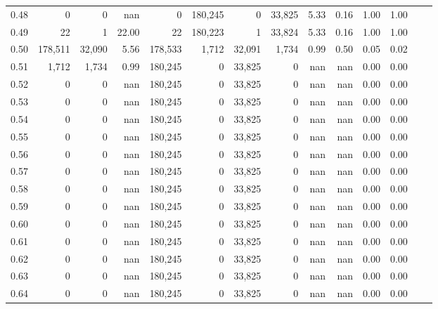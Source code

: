 \begin{tabular}{rrrrrrrrrrrrrr}
0.48 &        0 &       0 &     nan &        0 &  180,245 &       0 &  33,825 &  5.33 &  0.16 &  1.00 &      1.00 \\
0.49 &       22 &       1 &   22.00 &       22 &  180,223 &       1 &  33,824 &  5.33 &  0.16 &  1.00 &      1.00 \\
0.50 &  178,511 &  32,090 &    5.56 &  178,533 &    1,712 &  32,091 &   1,734 &  0.99 &  0.50 &  0.05 &      0.02 \\
0.51 &    1,712 &   1,734 &    0.99 &  180,245 &        0 &  33,825 &       0 &   nan &   nan &  0.00 &      0.00 \\
0.52 &        0 &       0 &     nan &  180,245 &        0 &  33,825 &       0 &   nan &   nan &  0.00 &      0.00 \\
0.53 &        0 &       0 &     nan &  180,245 &        0 &  33,825 &       0 &   nan &   nan &  0.00 &      0.00 \\
0.54 &        0 &       0 &     nan &  180,245 &        0 &  33,825 &       0 &   nan &   nan &  0.00 &      0.00 \\
0.55 &        0 &       0 &     nan &  180,245 &        0 &  33,825 &       0 &   nan &   nan &  0.00 &      0.00 \\
0.56 &        0 &       0 &     nan &  180,245 &        0 &  33,825 &       0 &   nan &   nan &  0.00 &      0.00 \\
0.57 &        0 &       0 &     nan &  180,245 &        0 &  33,825 &       0 &   nan &   nan &  0.00 &      0.00 \\
0.58 &        0 &       0 &     nan &  180,245 &        0 &  33,825 &       0 &   nan &   nan &  0.00 &      0.00 \\
0.59 &        0 &       0 &     nan &  180,245 &        0 &  33,825 &       0 &   nan &   nan &  0.00 &      0.00 \\
0.60 &        0 &       0 &     nan &  180,245 &        0 &  33,825 &       0 &   nan &   nan &  0.00 &      0.00 \\
0.61 &        0 &       0 &     nan &  180,245 &        0 &  33,825 &       0 &   nan &   nan &  0.00 &      0.00 \\
0.62 &        0 &       0 &     nan &  180,245 &        0 &  33,825 &       0 &   nan &   nan &  0.00 &      0.00 \\
0.63 &        0 &       0 &     nan &  180,245 &        0 &  33,825 &       0 &   nan &   nan &  0.00 &      0.00 \\
0.64 &        0 &       0 &     nan &  180,245 &        0 &  33,825 &       0 &   nan &   nan &  0.00 &      0.00 \\

\end{tabular}
